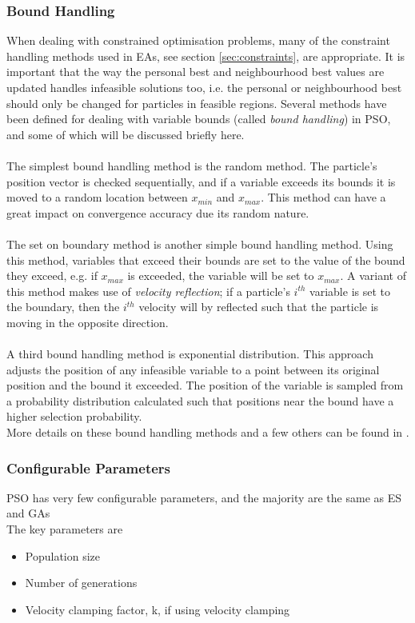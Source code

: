 \subsubsection{Bound Handling}
When dealing with constrained optimisation problems, many of the constraint handling methods used in EAs, see section \ref{sec:constraints}, are appropriate. It is important that the way the personal best and neighbourhood best values are updated handles infeasible solutions too, i.e. the personal or neighbourhood best should only be changed for particles in feasible regions\cite{4-pso}. Several methods have been defined for dealing with variable bounds (called \emph{bound handling}) in PSO, and some of which will be discussed briefly here.
\\\\The simplest bound handling method is the random method. The particle's position vector is checked sequentially, and if a variable exceeds its bounds it is moved to a random location between $x_{min}$ and $x_{max}$. This method can have a great impact on convergence accuracy due its random nature\cite{psobh}.
\\\\The set on boundary method is another simple bound handling method. Using this method, variables that exceed their bounds are set to the value of the bound they exceed, e.g. if $x_{max}$ is exceeded, the variable will be set to $x_{max}$. A variant of this method makes use of \emph{velocity reflection}; if a particle's $i^{th}$ variable is set to the boundary, then the $i^{th}$ velocity will by reflected such that the particle is moving in the opposite direction\cite{psobh}.
\\\\A third bound handling method is exponential distribution. This approach adjusts the position of any infeasible variable to a point between its original position and the bound it exceeded. The position of the variable is sampled from a probability distribution calculated such that positions near the bound have a higher selection probability\cite{psobh}.
\\More details on these bound handling methods and a few others can be found in \cite{psobh}.

\subsubsection{Configurable Parameters}
PSO has very few configurable parameters, and the majority are the same as ES and GAs
\\The key parameters are
\begin{itemize}
  \item{Population size}
  \item{Number of generations}
  \item{Velocity clamping factor, k, if using velocity clamping}
\end{itemize}

